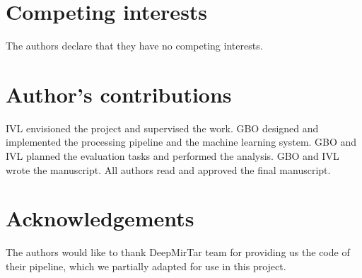 \documentclass{bmcart}
\begin{document}
\begin{backmatter}

\section*{Competing interests}
  The authors declare that they have no competing interests.

\section*{Author's contributions}
   IVL envisioned the project and supervised the work. GBO designed and implemented the processing pipeline and the machine learning system. GBO and IVL planned the evaluation tasks and performed the analysis. GBO and IVL wrote the manuscript.  All authors read and approved the final manuscript.
    
\section*{Acknowledgements}
  The authors would like to thank DeepMirTar team for providing us the code of their pipeline, which we partially adapted for use in this project.
 
 



\end{backmatter}
\end{document}

